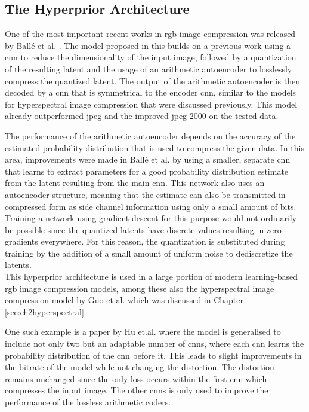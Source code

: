 \subsection{The Hyperprior Architecture}
One of the most important recent works in \ac{rgb} image compression was released by Ballé et al. \citep{balle_variational_2018}. The model proposed in this builds on a previous work \citep{balle_end--end_2017} using a \ac{cnn} to reduce the dimensionality of the input image, followed by a quantization of the resulting latent and the usage of an arithmetic autoencoder to losslessly compress the quantized latent. The output of the arithmetic autoencoder is then decoded by a \ac{cnn} that is symmetrical to the encoder \ac{cnn}, similar to the models for hyperspectral image compression that were discussed previously. This model already outperformed \ac{jpeg} and the improved \ac{jpeg} 2000 on the tested data.

The performance of the arithmetic autoencoder depends on the accuracy of the estimated probability distribution that is used to compress the given data. In this area, improvements were made in Ballé et al. \citep{balle_variational_2018} by using a smaller, separate \ac{cnn} that learns to extract parameters for a good probability distribution estimate from the latent resulting from the main \ac{cnn}. This network also uses an autoencoder structure, meaning that the estimate can also be transmitted in compressed form as side channel information using only a small amount of bits. Training a network using gradient descent for this purpose would not ordinarily be possible since the quantized latents have discrete values resulting in zero gradients everywhere. For this reason, the quantization is substituted during training by the addition of a small amount of uniform noise to dediscretize the latents.\\
This hyperprior architecture is used in a large portion of modern learning-based \ac{rgb} image compression models, among these also the hyperspectral image compression model by Guo et al. \citep{guo_learned_2021} which was discussed in Chapter \ref{sec:ch2hyperspectral}.

One such example is a paper by Hu et.al. \citep{hu_coarse--fine_2020} where the model is generalised to include not only two but an adaptable number of \acp{cnn}, where each \ac{cnn} learns the probability distribution of the \ac{cnn} before it. This leads to slight improvements in the bitrate of the model while not changing the distortion. The distortion remains unchanged since the only loss occurs within the first \ac{cnn} which compresses the input image. The other \acp{cnn} is only used to improve the performance of the lossless arithmetic coders.

